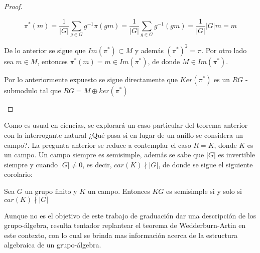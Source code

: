 \begin{proof}
\begin{enumerate}
\[\pi ^* (m) = \frac{1}{|G|} \sum_{g \in G}g^{-1}\pi (gm) = \frac{1}{|G|} \sum_{g \in G}g^{-1}(gm) = \frac{1}{|G|}|G|m  = m\]

De lo anterior se sigue que $Im(\pi^*) \subset M$ y además $(\pi^*)^2 = \pi $. Por otro lado sea $m \in M$, entonces $\pi ^* (m) = m \in Im(\pi^*)$, de donde $M \in Im(\pi^*)$. 

Por lo anteriormente expuesto se sigue directamente que $Ker(\pi^*)$ es un $RG$ - submodulo tal que $RG = M \oplus ker(\pi^*)$  \qedhere

\end{enumerate}
\end{proof} 

Como es usual en ciencias, se explorará un caso particular del teorema anterior con la interrogante natural ¿Qué pasa si en lugar de un anillo se considera un campo?. La pregunta anterior se reduce a contemplar el caso $R = K$, donde $K$ es un campo. Un campo siempre es semisimple, además se sabe que $|G|$ es invertible siempre y cuando $|G| \neq 0$, es decir, $car(K) \nmid |G|$, de donde se sigue el siguiente corolario:

\begin{corolario}\label{cor:car}
Sea $G$ un grupo finito y $K$ un campo. Entonces $KG$ es semisimple si y solo si $car(K) \nmid |G|$
\end{corolario}


Aunque no es el objetivo de este trabajo de graduación dar una descripción de los grupo-álgebra, resulta tentador replantear el teorema de Wedderburn-Artin en este contexto, con lo cual se brinda mas información acerca de la estructura algebraica de un grupo-álgebra.

